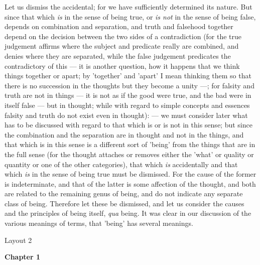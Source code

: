 Let us dismiss the accidental; for we have sufficiently determined its nature. But since that which \emph{is} in the sense of being true, or \emph{is not} in the sense of being false, depends on combination and separation, and truth and falsehood together depend on the decision between the two sides of a contradiction (for the true judgement affirms where the subject and predicate really are combined, and denies where they are separated, while the false judgement predicates the contradictory of this — it is another question, how it happens that we think things together or apart; by 'together' and 'apart' I mean thinking them so that there is no succession in the thoughts but they become a unity —; for falsity and truth are not in things — it is not as if the good were true, and the bad were in itself false — but in thought; while with regard to simple concepts and essences falsity and truth do not exist even in thought): — we must consider later what has to be discussed with regard to that which is or is not in this sense; but since the combination and the separation are in thought and not in the things, and that which is in this sense is a different sort of 'being' from the things that are in the full sense (for the thought attaches or removes either the 'what' or quality or quantity or one of the other categories), that which \emph{is} accidentally and that which \emph{is} in the sense of being true must be dismissed. For the cause of the former is indeterminate, and that of the latter is some affection of the thought, and both are related to the remaining genus of being, and do not indicate any separate class of being. Therefore let these be dismissed, and let us consider the causes and the principles of being itself, \emph{qua} being. It was clear in our discussion of the various meanings of terms, that 'being' has several meanings.


Layout 2

\textbf{Chapter 1}


